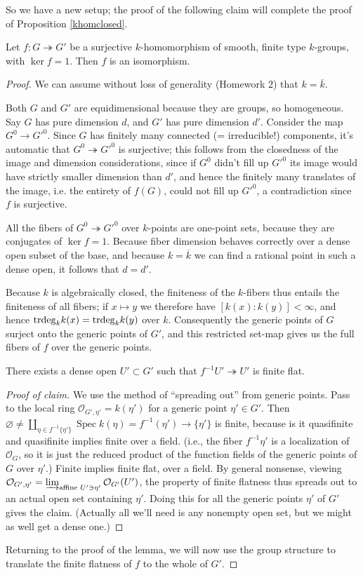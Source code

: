 \documentclass[10pt]{article}
\newcommand{\cO}{\mathcal{O}}
\renewcommand{\(}{\left(}
\renewcommand{\)}{\right)}
\renewcommand{\bar}{\overline}
\newcommand{\Spec}{\operatorname{Spec}}
\newcommand{\onto}{\twoheadrightarrow }
\numberwithin{thm}{subsection}
\begin{document}
So we have a new setup;
the proof of the following claim will complete the proof of Proposition
\ref{khomclosed}.
\begin{lem}
Let $f:G\onto G'$ be a surjective $k$-homomorphism
of smooth, finite type $k$-groups,
with $\ker f = 1$.
Then $f$ is an isomorphism.
\end{lem}
\begin{proof}
We can assume without loss of generality (Homework 2) 
that $k=\bar k$.

Both $G$ and $G'$ are equidimensional because they are groups, so homogeneous.
Say $G$ has pure dimension $d$, and $G'$ has pure dimension $d'$.
Consider the map $G^0\to G'^0$.
Since $G$ has finitely many connected (= irreducible!) components,
it's automatic that $G^0\onto G'^0$ is surjective;
this follows from the closedness of the image and dimension considerations,
since if $G^0$ didn't fill up $G'^0$ its image would have strictly smaller dimension than $d'$, and hence the finitely many translates of the image,
i.e. the entirety of $f(G)$, could not fill up $G'^0$, a contradiction
since $f$ is surjective.

All the fibers of $G^0\onto G'^0$ over $k$-points are one-point sets,
because they are conjugates of $\ker f=1$.
Because fiber dimension behaves correctly over a dense open subset
of the base, and because $k=\bar k$ we can find a rational point in
such a dense open, it follows that $d=d'$.

Because $k$ is algebraically closed,
the finiteness of the $k$-fibers thus entails the finiteness of all fibers;
if $x\mapsto y$ we therefore have $[k(x):k(y)]<\infty$,
and hence ${\rm{trdeg}}_k k(x)={\rm{trdeg}}_k k(y)$ over $k$.
Consequently the generic points of $G$ surject
onto the generic points of $G'$, and this restricted set-map
gives us the full fibers of $f$ over the generic points.
\begin{claim}There exists a dense open $U'\subset G'$
such that $f^{-1}U'\onto U'$ is finite flat.
\end{claim}
\begin{proof}[Proof of claim]
We use the method of ``spreading out'' from generic points.
Pass to the local ring $\cO_{G',\eta'}=k(\eta')$ for a generic point $\eta'\in G'$. Then $\varnothing\neq\coprod_{\eta\in f^{-1}\{\eta'\}}\Spec k(\eta)
=f^{-1}(\eta')\to \{\eta'\}$ is finite,
because is it quasifinite
and quasifinite implies finite over a field.
(i.e., the fiber $f^{-1}\eta'$ is a localization of $\cO_G$,
so it is just the reduced product of the function fields of the generic points
of $G$ over $\eta'$.)
Finite implies finite flat, over a field.
By general nonsense, viewing $\cO_{G',\eta'}=\varinjlim_{{\rm{affine}}\,\,U'\ni \eta'}\cO_{G'}(U')$, the property of finite flatness thus spreads out to an actual open set
containing $\eta'$.
Doing this for all the generic points $\eta'$ of $G'$ gives the claim.
(Actually all we'll need is any nonempty open set, but we might as well get a dense one.)
\end{proof}
Returning to the proof of the lemma,
we will now use the group structure to translate the finite flatness of $f$
to the whole of $G'$.


\end{proof}
\end{document}
